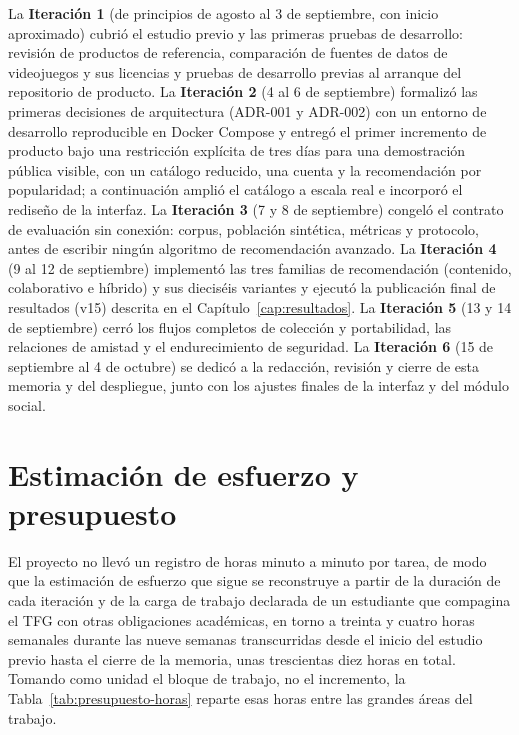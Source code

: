 La \textbf{Iteración 1} (de principios de agosto al 3 de septiembre, con inicio aproximado) cubrió el
estudio previo y las primeras pruebas de desarrollo: revisión de productos de referencia,
comparación de fuentes de datos de videojuegos y sus licencias y pruebas de desarrollo
previas al arranque del repositorio de producto. La \textbf{Iteración 2} (4 al 6 de septiembre)
formalizó las primeras decisiones de arquitectura (ADR-001 y ADR-002) con un entorno de
desarrollo reproducible en Docker Compose y entregó el primer incremento de producto bajo una
restricción explícita de tres días para una demostración pública visible, con un catálogo
reducido, una cuenta y la recomendación por popularidad; a continuación amplió el catálogo a
escala real e incorporó el rediseño de la interfaz. La \textbf{Iteración 3} (7 y 8 de
septiembre) congeló el contrato de evaluación sin conexión: corpus, población sintética, métricas y
protocolo, antes de escribir ningún algoritmo de recomendación avanzado. La
\textbf{Iteración 4} (9 al 12 de septiembre) implementó las tres familias de recomendación
(contenido, colaborativo e híbrido) y sus dieciséis variantes y ejecutó la publicación final de
resultados (v15) descrita en el Capítulo~\ref{cap:resultados}. La \textbf{Iteración 5} (13 y 14
de septiembre) cerró los flujos completos de colección y portabilidad, las relaciones de
amistad y el endurecimiento de seguridad. La \textbf{Iteración 6} (15 de septiembre al 4 de
octubre) se dedicó a la redacción, revisión y cierre de esta memoria y del despliegue, junto con
los ajustes finales de la interfaz y del módulo social.

\section{Estimación de esfuerzo y presupuesto}\label{sec:met-presupuesto}

El proyecto no llevó un registro de horas minuto a minuto por tarea, de modo que la estimación
de esfuerzo que sigue se reconstruye a partir de la duración de cada iteración y de la carga de
trabajo declarada de un estudiante que compagina el TFG con otras obligaciones académicas,
en torno a treinta y cuatro horas semanales durante las nueve semanas transcurridas desde el inicio
del estudio previo hasta el cierre de la memoria, unas trescientas diez horas en total. Tomando
como unidad el bloque de trabajo, no el incremento, la Tabla~\ref{tab:presupuesto-horas}
reparte esas horas entre las grandes áreas del trabajo.

